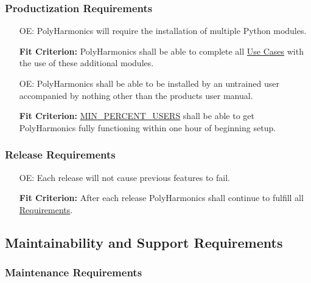 \documentclass[12pt]{article}
\newcounter{oaenum}
\newcommand{\progname}{PolyHarmonics}
\begin{document}
\subsubsection{Productization Requirements}

\noindent \begin{itemize}
\item[OE\refstepcounter{oaenum}\theoaenum\label{NF_PR1}:] \progname{} will
  require the installation of multiple Python modules.

  \textbf{Fit Criterion:} \progname{} shall be able to complete all
\hyperref[UseCase]{Use Cases} with the use of these additional modules.


\item[OE\refstepcounter{oaenum}\theoaenum\label{NF_PR2}:] \progname{} shall be
  able to be installed by an untrained user accompanied by nothing other than
  the products user manual.

  \textbf{Fit Criterion:} \hyperref[AppendA]{MIN\_PERCENT\_USERS} shall be able
  to get \progname{} fully functioning within one hour of beginning setup.
\end{itemize}

\subsubsection{Release Requirements}

\noindent \begin{itemize}


\item[OE\refstepcounter{oaenum}\theoaenum\label{NF_RP2}:] Each release will not
  cause previous features to fail.

  \textbf{Fit Criterion:} After each release \progname{} shall continue to
   fulfill all \newline \hyperref[Func]{Requirements}.

\end{itemize}

\subsection{Maintainability and Support Requirements}

\subsubsection{Maintenance Requirements}
\end{document}
